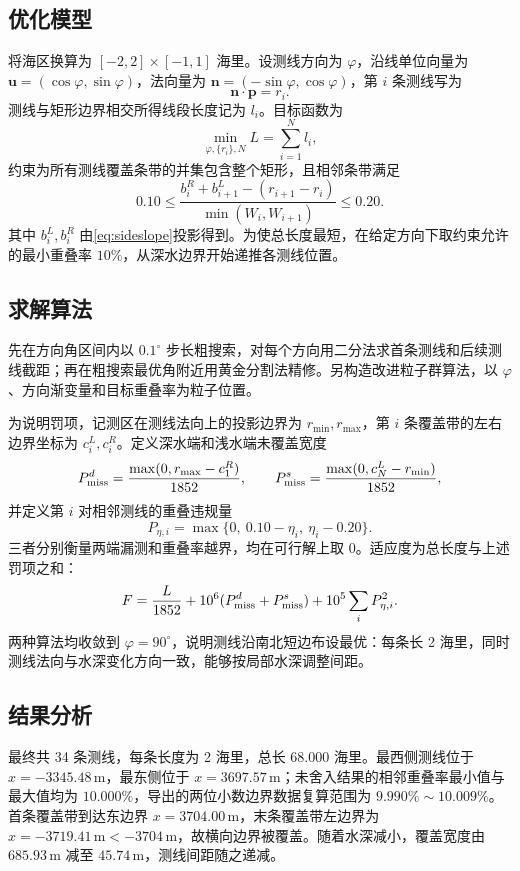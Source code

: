 \documentclass[withoutpreface,notoc]{cumcmthesis}
\begin{document}
\subsection{优化模型}
将海区换算为 $[-2,2]\times[-1,1]$ 海里。设测线方向为 $\varphi$，沿线单位向量为 $\boldsymbol u=(\cos\varphi,\sin\varphi)$，法向量为 $\boldsymbol n=(-\sin\varphi,\cos\varphi)$，第 $i$ 条测线写为
\begin{equation}
\boldsymbol n\cdot\boldsymbol p=r_i.
\end{equation}
测线与矩形边界相交所得线段长度记为 $l_i$。目标函数为
\begin{equation}\label{eq:q3obj}
\min_{\varphi,\{r_i\},N} L=\sum_{i=1}^{N}l_i,
\end{equation}
约束为所有测线覆盖条带的并集包含整个矩形，且相邻条带满足
\begin{equation}
0.10\leq \frac{b_i^R+b_{i+1}^L-(r_{i+1}-r_i)}{\min(W_i,W_{i+1})}\leq0.20.
\end{equation}
其中 $b_i^L,b_i^R$ 由\cref{eq:sideslope}投影得到。为使总长度最短，在给定方向下取约束允许的最小重叠率 $10\%$，从深水边界开始递推各测线位置。

\subsection{求解算法}
先在方向角区间内以 $0.1^\circ$ 步长粗搜索，对每个方向用二分法求首条测线和后续测线截距；再在粗搜索最优角附近用黄金分割法精修。另构造改进粒子群算法\cite{pso}，以 $\varphi$、方向渐变量和目标重叠率为粒子位置。

为说明罚项，记测区在测线法向上的投影边界为 $r_{\min},r_{\max}$，第 $i$ 条覆盖带的左右边界坐标为 $c_i^L,c_i^R$。定义深水端和浅水端未覆盖宽度
\[
P_{\rm miss}^{d}=\frac{\max(0,r_{\max}-c_1^R)}{1852},\qquad
P_{\rm miss}^{s}=\frac{\max(0,c_N^L-r_{\min})}{1852},
\]
并定义第 $i$ 对相邻测线的重叠违规量
\[
P_{\eta,i}=\max\{0,\ 0.10-\eta_i,\ \eta_i-0.20\}.
\]
三者分别衡量两端漏测和重叠率越界，均在可行解上取 0。适应度为总长度与上述罚项之和：
\begin{equation}
F=\frac{L}{1852}+10^6(P_{\rm miss}^{d}+P_{\rm miss}^{s})+10^5\sum_i P_{\eta,i}^2.
\end{equation}
两种算法均收敛到 $\varphi=90^\circ$，说明测线沿南北短边布设最优：每条长 2 海里，同时测线法向与水深变化方向一致，能够按局部水深调整间距。

\subsection{结果分析}
最终共 34 条测线，每条长度为 2 海里，总长 $68.000$ 海里。最西侧测线位于 $x=-3345.48\,\mathrm m$，最东侧位于 $x=3697.57\,\mathrm m$；未舍入结果的相邻重叠率最小值与最大值均为 $10.000\%$，导出的两位小数边界数据复算范围为 $9.990\%\sim10.009\%$。首条覆盖带到达东边界 $x=3704.00\,\mathrm m$，末条覆盖带左边界为 $x=-3719.41\,\mathrm m<-3704\,\mathrm m$，故横向边界被覆盖。随着水深减小，覆盖宽度由 $685.93\,\mathrm m$ 减至 $45.74\,\mathrm m$，测线间距随之递减。
\end{document}
